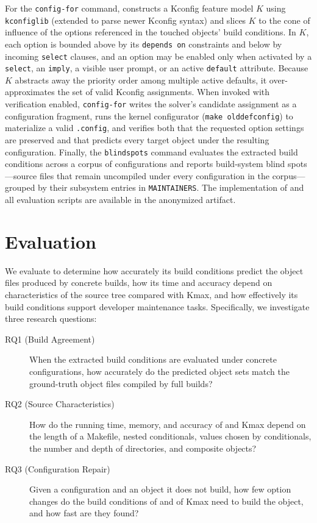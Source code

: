 \documentclass[acmsmall,screen,review,anonymous,nonacm]{acmart}
\begin{document}
For the \texttt{config-for} command, \tool{} constructs a Kconfig feature model $K$ using \texttt{kconfiglib} (extended to parse newer Kconfig syntax) and slices $K$ to the cone of influence of the options referenced in the touched objects' build conditions.
In $K$, each option is bounded above by its \texttt{depends on} constraints and below by incoming \texttt{select} clauses, and an option may be enabled only when activated by a \texttt{select}, an \texttt{imply}, a visible user prompt, or an active \texttt{default} attribute.
Because $K$ abstracts away the priority order among multiple active defaults, it over-approximates the set of valid Kconfig assignments.
When invoked with verification enabled, \texttt{config-for} writes the solver's candidate assignment as a configuration fragment, runs the kernel configurator (\texttt{make olddefconfig}) to materialize a valid \texttt{.config}, and verifies both that the requested option settings are preserved and that \tool{} predicts every target object under the resulting configuration.
Finally, the \texttt{blindspots} command evaluates the extracted build conditions across a corpus of configurations and reports build-system blind spots---source files that remain uncompiled under every configuration in the corpus---grouped by their subsystem entries in \texttt{MAINTAINERS}.
The implementation of \tool{} and all evaluation scripts are available in the anonymized artifact.

\section{Evaluation}\label{sec:eval}

We evaluate \tool{} to determine how accurately its build conditions predict the object files produced by concrete builds, how its time and accuracy depend on characteristics of the source tree compared with Kmax, and how effectively its build conditions support developer maintenance tasks.
Specifically, we investigate three research questions:
\begin{description}
\item[RQ1 (Build Agreement)] When the extracted build conditions are evaluated under concrete configurations, how accurately do the predicted object sets match the ground-truth object files compiled by full builds?
\item[RQ2 (Source Characteristics)] How do the running time, memory, and accuracy of \tool{} and Kmax depend on the length of a Makefile, nested conditionals, values chosen by conditionals, the number and depth of directories, and composite objects?
\item[RQ3 (Configuration Repair)] Given a configuration and an object it does not build, how few option changes do the build conditions of \tool{} and of Kmax need to build the object, and how fast are they found?
\end{description}
\end{document}
